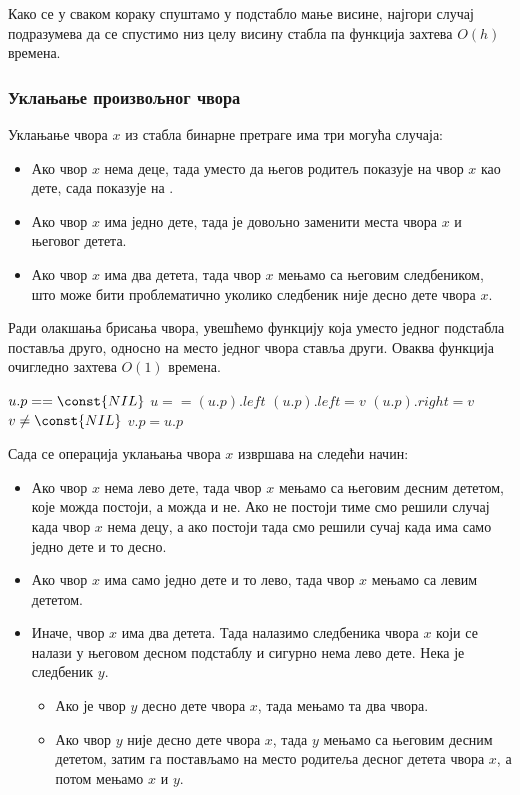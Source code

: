 \documentclass[11pt, a4paper]{article}
\theoremstyle{remark}
\numberwithin{equation}{section}
\begin{document}
	Како се у сваком кораку спуштамо у подстабло мање висине, најгори случај подразумева да се спустимо низ целу висину стабла па функција  захтева $O(h)$ времена.
	
	\subsubsection{Уклањање произвољног чвора} 
	Уклањање чвора $x$ из стабла бинарне претраге има три могућа случаја:
		\begin{itemize}
		\item Ако чвор $x$ нема деце, тада уместо да његов родитељ показује на чвор $x$ као дете, сада показује на .
		\item Ако чвор $x$ има једно дете, тада је довољно заменити места чвора $x$ и његовог детета.
		\item Ако чвор $x$ има два детета, тада чвор $x$ мењамо са његовим следбеником, што може бити проблематично уколико следбеник није десно дете чвора $x$.
	\end{itemize}

	\noindent Ради олакшања брисања чвора, увешћемо функцију  која уместо једног подстабла поставља друго, односно на место једног чвора ставља други. Оваква функција очигледно захтева $O(1)$ времена.
	
	\begin{codebox}
		\li \If $u.p==\const{NIL}$
		\li \Do \Return
		\End
		\li \If $u==(u.p).left$
		\li \Do  $(u.p).left=v$
		\End
		\li \Else $(u.p).right=v$
		\li \If $v \neq \const{NIL}$
		\li \Do $v.p=u.p$
		\End
	\end{codebox}

	\noindent Сада се операција уклањања чвора $x$ извршава на следећи начин:
	\begin{itemize}
		\item Ако чвор $x$ нема лево дете, тада чвор $x$ мењамо са његовим десним дететом, које можда постоји, а можда и не. Ако не постоји тиме смо решили случај када чвор $x$ нема децу, а ако постоји тада смо решили сучај када има само једно дете и то десно.
		\item Ако чвор $x$ има само једно дете и то лево, тада чвор $x$ мењамо са левим дететом.
		\item Иначе, чвор $x$ има два детета. Тада налазимо следбеника чвора $x$ који се налази у његовом десном подстаблу и сигурно нема лево дете. Нека је следбеник $y$.
			\begin{itemize}
				\item Ако је чвор $y$ десно дете чвора $x$, тада мењамо та два чвора.
				\item Ако чвор $y$ није десно дете чвора $x$, тада $y$ мењамо са његовим десним дететом, затим га постављамо на место родитеља десног детета чвора $x$, а потом мењамо $x$ и $y$.
			\end{itemize}
	\end{itemize}
	
\end{document}
